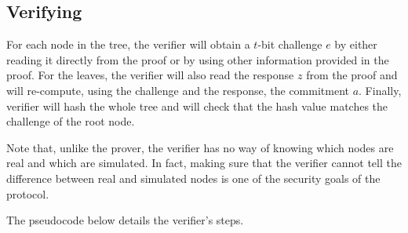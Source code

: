 \documentclass[11pt]{llncs}
\begin{document}
\subsection{Verifying}
\label{sec:verifying}


For each node in the tree, the verifier will obtain a $t$-bit challenge $e$ by either reading it directly from the proof or by using other information provided in the proof. For the leaves, the verifier will also read the response $z$ from the proof and will re-compute, using the challenge and the response, the commitment $a$.  Finally, verifier will hash the whole tree and will check that the hash value matches the challenge of the root node.

Note that, unlike the prover, the verifier has no way of knowing which nodes are real and which are simulated. In fact, making sure that the verifier cannot tell the difference between real and simulated nodes is one of the security goals of the protocol.

The pseudocode below details the verifier's steps.
\end{document}

